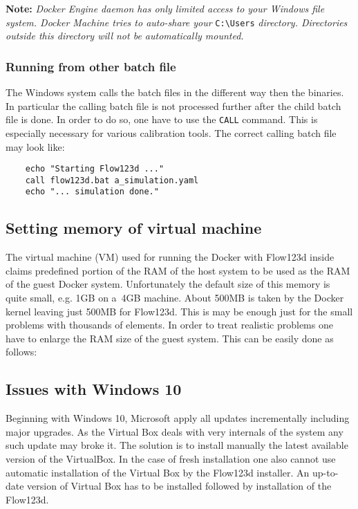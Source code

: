 \documentclass[12pt,a4paper]{report}
\begin{document}
\textbf{Note:}
\textit{Docker Engine daemon has only limited access to your Windows file system. Docker Machine tries to auto-share your}
\verb'C:\Users' \textit{directory. Directories outside this directory will not be automatically mounted.} 

\subsubsection{Running from other batch file}
The Windows system calls the batch files in the different way then the binaries. In particular the calling batch file is not processed further after the child batch 
file is done. In order to do so, one have to use the \verb'CALL' command. This is especially necessary for various calibration tools. The correct calling batch file 
may look like:
\begin{verbatim}
    echo "Starting Flow123d ..."
    call flow123d.bat a_simulation.yaml 
    echo "... simulation done."
\end{verbatim}


\subsection{Setting memory of virtual machine}
The virtual machine (VM) used for running the Docker with Flow123d inside claims predefined portion of the RAM 
of the host system to be used as the RAM of the guest Docker system. Unfortunately the default size of this memory is
quite small, e.g. 1GB on a~4GB machine. About 500MB is taken by the Docker kernel leaving just 500MB for Flow123d.
This is may be enough just for the small problems with thousands of elements. In order to treat realistic problems one have to 
enlarge the RAM size of the guest system. This can be easily done as follows:

\subsection{Issues with Windows 10}
Beginning with Windows 10, Microsoft apply all updates incrementally including major upgrades. As the Virtual Box deals with very internals of the system
any such update may broke it. The solution is to install manually the latest available version of the VirtualBox. In the case of fresh installation 
one also cannot use automatic installation of the Virtual Box by the Flow123d installer. An up-to-date version of Virtual Box has to be installed followed by 
installation of the Flow123d.
\end{document}
